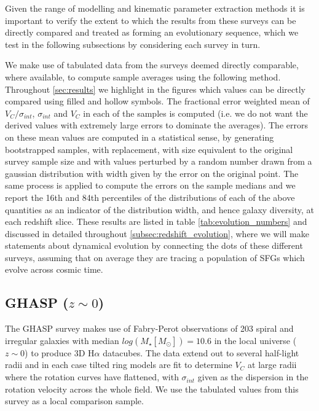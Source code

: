 \documentclass[fleqn,usenatbib]{mn2e}
\begin{document}
Given the range of modelling and kinematic parameter extraction methods it is important to verify the extent to which the results from these surveys can be directly compared and treated as forming an evolutionary sequence, which we test in the following subsections by considering each survey in turn.

We make use of tabulated data from the surveys deemed directly comparable, where available, to compute sample averages using the following method. 
Throughout \cref{sec:results} we highlight in the figures which values can be directly compared using filled and hollow symbols.
The fractional error weighted mean of $V_{C}/\sigma_{int}$, $\sigma_{int}$ and $V_{C}$ in each of the samples is computed (i.e. we do not want the derived values with extremely large errors to dominate the averages).
The errors on these mean values are computed in a statistical sense, by generating bootstrapped samples, with replacement, with size equivalent to the original survey sample size and with values perturbed by a random number drawn from a gaussian distribution with width given by the error on the original point.
The same process is applied to compute the errors on the sample medians and we report the 16th and 84th percentiles of the distributions of each of the above quantities as an indicator of the distribution width, and hence galaxy diversity, at each redshift slice.
These results are listed in table \ref{tab:evolution_numbers} and discussed in detailed throughout \cref{subsec:redshift_evolution}, where we will make statements about dynamical evolution by connecting the dots of these different surveys, assuming that on average they are tracing a population of SFGs which evolve across cosmic time. 

\subsection{GHASP ($z\sim0$)}\label{subsec:GHASP}
The GHASP survey \citep[E08]{Epinat2008,Epinat2008a} makes use of Fabry-Perot observations of 203 spiral and irregular galaxies with median $log(M_{\star}[M_{\odot}])=10.6$ in the local universe ($z\sim0$) to produce 3D H$\alpha$ datacubes.
The data extend out to several half-light radii and in each case tilted ring models are fit to determine $V_{C}$ at large radii where the rotation curves have flattened, with $\sigma_{int}$ given as the dispersion in the rotation velocity across the whole field.
We use the tabulated values from this survey as a local comparison sample.
\end{document}
